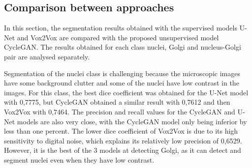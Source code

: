 \subsection{Comparison between approaches}

In this section, the segmentation results obtained with the supervised models U-Net and Vox2Vox are compared with the proposed unsupervised model CycleGAN. The results obtained for each class nuclei, Golgi and nucleus-Golgi pair are analysed separately.

\begin{table}[!htb]
  \centering
  \caption{Average results obtained for the three different models tested}
  \label{tab:results-all}
  \renewcommand\arraystretch{1.4}
\end{table}

Segmentation of the nuclei class is challenging because the microscopic images have some background clutter and some of the nuclei have low contrast in the images. For this class, the best dice coefficient was obtained for the U-Net model with 0,7775, but CycleGAN obtained a similar result with 0,7612 and then Vox2Vox with 0,7464. The precision and recall values for the CycleGAN and U-Net models are also very close, with the CycleGAN model only being inferior by less than one percent. The lower dice coefficient of Vox2Vox is due to its high sensitivity to digital noise, which explains its relatively low precision of 0,6529. However, it is the best of the 3 models at detecting Golgi, as it can detect and segment nuclei even when they have low contrast.

